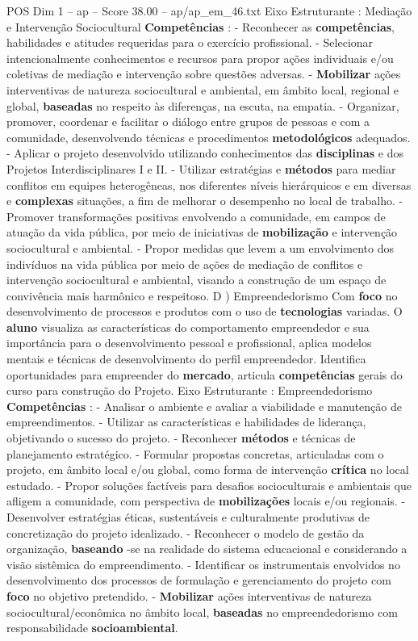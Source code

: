 \begin{textsample}{POS Dim 1 – ap – Score 38.00 – ap/ap\_em\_46.txt}
Eixo Estruturante : Mediação e Intervenção Sociocultural \textbf{Competências} : - Reconhecer as \textbf{competências}, habilidades e atitudes requeridas para o exercício profissional. - Selecionar intencionalmente conhecimentos e recursos para propor ações individuais e/ou coletivas de mediação e intervenção sobre questões adversas. - \textbf{Mobilizar} ações interventivas de natureza sociocultural e ambiental, em âmbito local, regional e global, \textbf{baseadas} no respeito às diferenças, na escuta, na empatia. - Organizar, promover, coordenar e facilitar o diálogo entre grupos de pessoas e com a comunidade, desenvolvendo técnicas e procedimentos \textbf{metodológicos} adequados. - Aplicar o projeto desenvolvido utilizando conhecimentos das \textbf{disciplinas} e dos Projetos Interdisciplinares I e II. - Utilizar estratégias e \textbf{métodos} para mediar conflitos em equipes heterogêneas, nos diferentes níveis hierárquicos e em diversas e \textbf{complexas} situações, a fim de melhorar o desempenho no local de trabalho. - Promover transformações positivas envolvendo a comunidade, em campos de atuação da vida pública, por meio de iniciativas de \textbf{mobilização} e intervenção sociocultural e ambiental. - Propor medidas que levem a um envolvimento dos indivíduos na vida pública por meio de ações de mediação de conflitos e intervenção sociocultural e ambiental, visando a construção de um espaço de convivência mais harmônico e respeitoso.
D ) Empreendedorismo Com \textbf{foco} no desenvolvimento de processos e produtos com o uso de \textbf{tecnologias} variadas.
O \textbf{aluno} visualiza as características do comportamento empreendedor e sua importância para o desenvolvimento pessoal e profissional, aplica modelos mentais e técnicas de desenvolvimento do perfil empreendedor.
Identifica oportunidades para empreender do \textbf{mercado}, articula \textbf{competências} gerais do curso para construção do Projeto.
Eixo Estruturante : Empreendedorismo \textbf{Competências} : - Analisar o ambiente e avaliar a viabilidade e manutenção de empreendimentos. - Utilizar as características e habilidades de liderança, objetivando o sucesso do projeto. - Reconhecer \textbf{métodos} e técnicas de planejamento estratégico. - Formular propostas concretas, articuladas com o projeto, em âmbito local e/ou global, como forma de intervenção \textbf{crítica} no local estudado. - Propor soluções factíveis para desafios socioculturais e ambientais que afligem a comunidade, com perspectiva de \textbf{mobilizações} locais e/ou regionais. - Desenvolver estratégias éticas, sustentáveis e culturalmente produtivas de concretização do projeto idealizado. - Reconhecer o modelo de gestão da organização, \textbf{baseando} -se na realidade do sistema educacional e considerando a visão sistêmica do empreendimento. - Identificar os instrumentais envolvidos no desenvolvimento dos processos de formulação e gerenciamento do projeto com \textbf{foco} no objetivo pretendido. - \textbf{Mobilizar} ações interventivas de natureza sociocultural/econômica no âmbito local, \textbf{baseadas} no empreendedorismo com responsabilidade \textbf{socioambiental}.

\end{textsample}

